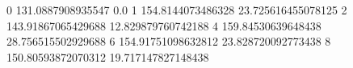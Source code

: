 0 131.0887908935547 0.0
1 154.8144073486328 23.725616455078125
2 143.91867065429688 12.829879760742188
4 159.84530639648438 28.756515502929688
6 154.91751098632812 23.828720092773438
8 150.80593872070312 19.717147827148438
